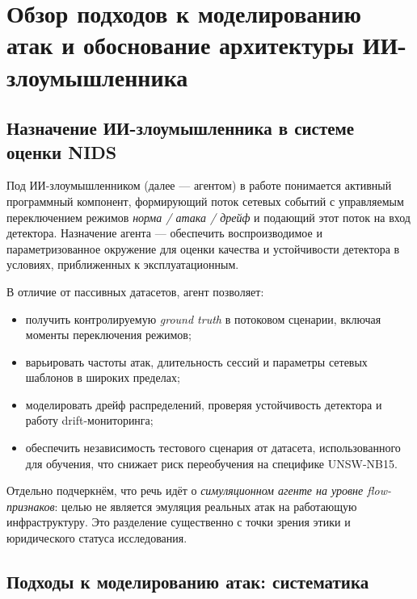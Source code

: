 
\section{Обзор подходов к моделированию атак и обоснование архитектуры ИИ-злоумышленника}

\subsection{Назначение ИИ-злоумышленника в системе оценки NIDS}

Под ИИ-злоумышленником (далее --- агентом) в работе понимается активный
программный компонент, формирующий поток сетевых событий с управляемым
переключением режимов \emph{норма / атака / дрейф} и подающий этот поток на
вход детектора. Назначение агента --- обеспечить воспроизводимое и
параметризованное окружение для оценки качества и устойчивости детектора в
условиях, приближенных к эксплуатационным.

В отличие от пассивных датасетов, агент позволяет:
\begin{itemize}
    \item получить контролируемую \emph{ground truth} в потоковом сценарии,
    включая моменты переключения режимов;
    \item варьировать частоты атак, длительность сессий и параметры сетевых
    шаблонов в широких пределах;
    \item моделировать дрейф распределений, проверяя устойчивость детектора
    и работу drift-мониторинга;
    \item обеспечить независимость тестового сценария от датасета,
    использованного для обучения, что снижает риск переобучения на специфике
    UNSW-NB15.
\end{itemize}

Отдельно подчеркнём, что речь идёт о \emph{симуляционном агенте на уровне
flow-признаков}: целью не является эмуляция реальных атак на работающую
инфраструктуру. Это разделение существенно с точки зрения этики и
юридического статуса исследования.

\subsection{Подходы к моделированию атак: систематика}

